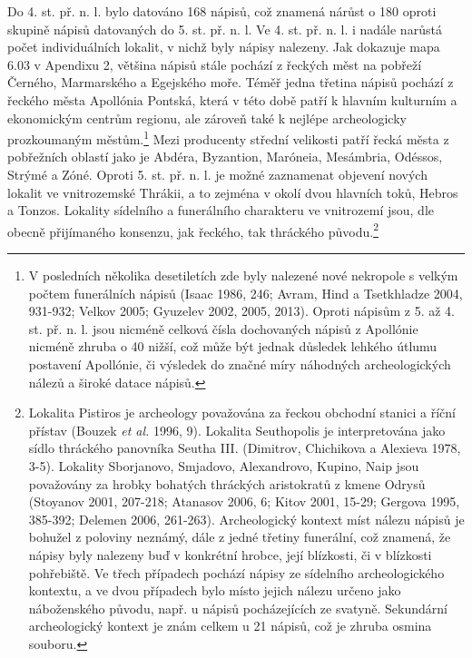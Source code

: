 Do 4. st. př. n. l. bylo datováno 168 nápisů, což znamená nárůst o 180  oproti skupině nápisů datovaných do 5. st. př. n. l. Ve 4. st. př. n. l. i nadále narůstá počet individuálních lokalit, v nichž byly nápisy nalezeny. Jak dokazuje mapa 6.03 v Apendixu 2, většina nápisů stále pochází z řeckých měst na pobřeží Černého, Marmarského a Egejského moře. Téměř jedna třetina nápisů pochází z řeckého města Apollónia Pontská, která v této době patří k hlavním kulturním a ekonomickým centrům regionu, ale zároveň také k nejlépe archeologicky prozkoumaným městům.\footnote{V posledních několika desetiletích zde byly nalezené nové nekropole s velkým počtem funerálních nápisů (Isaac 1986, 246; Avram, Hind a Tsetkhladze 2004, 931-932; Velkov 2005; Gyuzelev 2002, 2005, 2013). Oproti nápisům z 5. až 4. st. př. n. l. jsou nicméně celková čísla dochovaných nápisů z Apollónie nicméně zhruba o 40  nižší, což může být jednak důsledek lehkého útlumu postavení Apollónie, či výsledek do značné míry náhodných archeologických nálezů a široké datace nápisů.} Mezi producenty střední velikosti patří řecká města z pobřežních oblastí jako je Abdéra, Byzantion, Maróneia, Mesámbria, Odéssos, Strýmé a Zóné. Oproti 5. st. př. n. l. je možné zaznamenat objevení nových lokalit ve vnitrozemské Thrákii, a to zejména v okolí dvou hlavních toků, Hebros a Tonzos. Lokality sídelního a funerálního charakteru ve vnitrozemí jsou, dle obecně přijímaného konsenzu, jak řeckého, tak thráckého původu.\footnote{Lokalita Pistiros je archeology považována za řeckou obchodní stanici a říční přístav (Bouzek {\em et al.} 1996, 9). Lokalita Seuthopolis je interpretována jako sídlo thráckého panovníka Seutha III. (Dimitrov, Chichikova a Alexieva 1978, 3-5). Lokality Sborjanovo, Smjadovo, Alexandrovo, Kupino, Naip jsou považovány za hrobky bohatých thráckých aristokratů z kmene Odrysů (Stoyanov 2001, 207-218; Atanasov 2006, 6; Kitov 2001, 15-29; Gergova 1995, 385-392; Delemen 2006, 261-263). Archeologický kontext míst nálezu nápisů je bohužel z poloviny neznámý, dále z jedné třetiny funerální, což znamená, že nápisy byly nalezeny buď v konkrétní hrobce, její blízkosti, či v blízkosti pohřebiště. Ve třech případech pochází nápisy ze sídelního archeologického kontextu, a ve dvou případech bylo místo jejich nálezu určeno jako náboženského původu, např. u nápisů pocházejících ze svatyně. Sekundární archeologický kontext je znám celkem u 21 nápisů, což je zhruba osmina souboru.}

